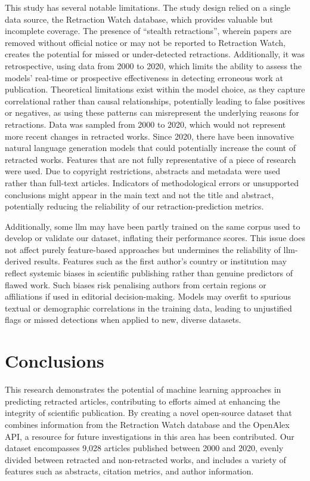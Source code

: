 \documentclass[pdflatex,sn-mathphys-num]{sn-jnl}
\begin{document}
This study has several notable limitations. The study design relied on a single data source, the Retraction Watch database, which provides valuable but incomplete coverage. The presence of ``stealth retractions'', wherein papers are removed without official notice or may not be reported to Retraction Watch, creates the potential for missed or under-detected retractions. Additionally, it was retrospective, using data from 2000 to 2020, which limits the ability to assess the models' real-time or prospective effectiveness in detecting erroneous work at publication. Theoretical limitations exist within the model choice, as they capture correlational rather than causal relationships, potentially leading to false positives or negatives, as using these patterns can misrepresent the underlying reasons for retractions. Data was sampled from 2000 to 2020, which would not represent more recent changes in retracted works. Since 2020, there have been innovative natural language generation models that could potentially increase the count of retracted works. Features that are not fully representative of a piece of research were used. Due to copyright restrictions, abstracts and metadata were used rather than full-text articles. Indicators of methodological errors or unsupported conclusions might appear in the main text and not the title and abstract, potentially reducing the reliability of our retraction-prediction metrics.

Additionally, some \gls*{llm} may have been partly trained on the same corpus used to develop or validate our dataset, inflating their performance scores. This issue does not affect purely feature-based approaches but undermines the reliability of \gls*{llm}-derived results. Features such as the first author’s country or institution may reflect systemic biases in scientific publishing rather than genuine predictors of flawed work. Such biases risk penalising authors from certain regions or affiliations if used in editorial decision-making. Models may overfit to spurious textual or demographic correlations in the training data, leading to unjustified flags or missed detections when applied to new, diverse datasets.

\section{Conclusions}
\label{sec:Conclusions}

This research demonstrates the potential of machine learning approaches in predicting retracted articles, contributing to efforts aimed at enhancing the integrity of scientific publication. By creating a novel open-source dataset that combines information from the Retraction Watch database and the OpenAlex API, a resource for future investigations in this area has been contributed. Our dataset encompasses 9,028  articles published between 2000 and 2020, evenly divided between retracted and non-retracted works, and includes a variety of features such as abstracts, citation metrics, and author information.
\end{document}
